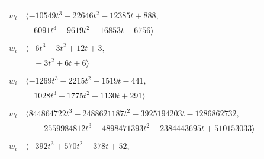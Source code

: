 \documentclass[11pt]{article}
\begin{document}
\begin{longtable}{@{}ll@{}}
\addlinespace[2pt]
\multicolumn{2}{@{}p{0.97\textwidth}@{}}{$i=23$, $D_i=81$, $\rho_{ij}$: $14{:}1, \allowbreak 18{:}2, \allowbreak 20{:}2, \allowbreak 26{:}2, \allowbreak 27{:}1, \allowbreak 34{:}1, \allowbreak 36{:}2, \allowbreak 43{:}2, \allowbreak 59{:}2, \allowbreak 67{:}2, \allowbreak 69{:}1, \allowbreak 73{:}1$}\\
$w_i$ & $\langle -10549t^{3}-22646t^{2}-12385t+888,$\\
 & $\quad 6091t^{3}-9619t^{2}-16853t-6756\rangle$\\
\addlinespace[2pt]
\multicolumn{2}{@{}p{0.97\textwidth}@{}}{$i=24$, $D_i=3$, $\rho_{ij}$: $21{:}1, \allowbreak 40{:}1, \allowbreak 53{:}2, \allowbreak 55{:}1, \allowbreak 64{:}1$}\\
$w_i$ & $\langle -6t^{3}-3t^{2}+12t+3,$\\
 & $\quad -3t^{2}+6t+6\rangle$\\
\addlinespace[2pt]
\multicolumn{2}{@{}p{0.97\textwidth}@{}}{$i=25$, $D_i=27$, $\rho_{ij}$: $3{:}2, \allowbreak 5{:}2, \allowbreak 9{:}1, \allowbreak 11{:}2, \allowbreak 33{:}2, \allowbreak 34{:}1, \allowbreak 38{:}2, \allowbreak 43{:}1, \allowbreak 47{:}1, \allowbreak 60{:}1, \allowbreak 68{:}1, \allowbreak 72{:}2$}\\
$w_i$ & $\langle -1269t^{3}-2215t^{2}-1519t-441,$\\
 & $\quad 1028t^{3}+1775t^{2}+1130t+291\rangle$\\
\addlinespace[2pt]
\multicolumn{2}{@{}p{0.97\textwidth}@{}}{$i=26$, $D_i=6561$, $\rho_{ij}$: $0{:}2, \allowbreak 1{:}2, \allowbreak 4{:}2, \allowbreak 6{:}2, \allowbreak 13{:}2, \allowbreak 16{:}1, \allowbreak 18{:}2, \allowbreak 19{:}2, \allowbreak 23{:}1, \allowbreak 30{:}1, \allowbreak 32{:}2, \allowbreak 35{:}1, \allowbreak 38{:}2, \allowbreak 44{:}2, \allowbreak 45{:}2, \allowbreak 51{:}1, \allowbreak 53{:}2, \allowbreak 67{:}1, \allowbreak 69{:}1, \allowbreak 74{:}2$}\\
$w_i$ & $\langle 844864722t^{3}-2488621187t^{2}-3925194203t-1286862732,$\\
 & $\quad -2559984812t^{3}-4898471393t^{2}-2384443695t+510153033\rangle$\\
\addlinespace[2pt]
\multicolumn{2}{@{}p{0.97\textwidth}@{}}{$i=27$, $D_i=9$, $\rho_{ij}$: $12{:}2, \allowbreak 23{:}2, \allowbreak 29{:}1, \allowbreak 31{:}2, \allowbreak 32{:}2, \allowbreak 37{:}2, \allowbreak 42{:}1, \allowbreak 47{:}1, \allowbreak 64{:}1, \allowbreak 73{:}1$}\\
$w_i$ & $\langle -392t^{3}+570t^{2}-378t+52,$\\

\end{longtable}
\end{document}
